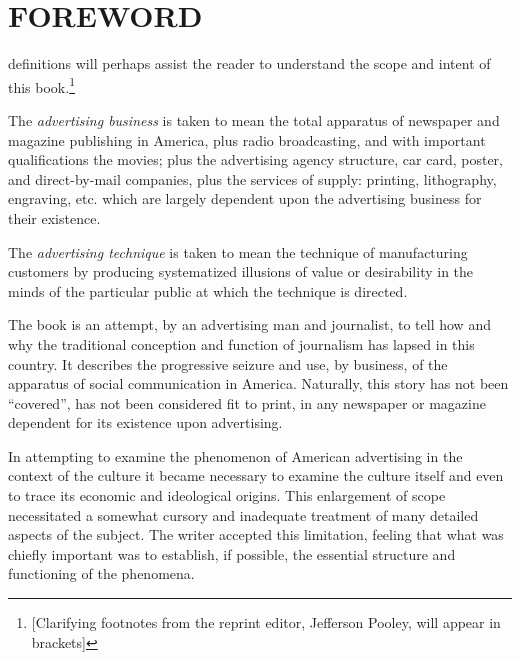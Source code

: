 \documentclass[openany,nobib]{tufte-book}
\let\oldchapter\chapter
\def\chapter{%
  \setcounter{footnote}{0}%
  \oldchapter
}
\begin{document}
\chapter{FOREWORD}
\label{ch:foreword}

 definitions will perhaps assist the reader to 
understand the scope and intent of this book.\footnote{[Clarifying footnotes from the reprint editor, Jefferson Pooley, will appear in brackets]} 

The \emph{advertising business} is taken to mean the total apparatus of
newspaper and magazine publishing in America, plus radio broadcasting,
and with important qualifications the movies; plus the advertising
agency structure, car card, poster, and direct-by-mail companies, plus
the services of supply: printing, lithography, engraving, etc. which are
largely dependent upon the advertising business for their existence.

The \emph{advertising technique} is taken to mean the technique of
manufacturing customers by producing systematized illusions of value or
desirability in the minds of the particular public at which the
technique is directed.

The book is an attempt, by an advertising man and journalist, to tell
how and why the traditional conception and function of journalism has
lapsed in this country. It describes the progressive seizure and use, by
business, of the apparatus of social communication in America.
Naturally, this story has not been ``covered'', has not been considered
fit to print, in any newspaper or magazine dependent for its existence
upon advertising.

In attempting to examine the phenomenon of American advertising in the
context of the culture it became necessary to examine the culture itself
and even to trace its economic and ideological origins. This enlargement
of scope necessitated a somewhat cursory and inadequate treatment of
many detailed aspects of the subject. The writer accepted this
limitation, feeling that what was chiefly important was to establish, if
possible, the essential structure and functioning of the phenomena.
\end{document}
